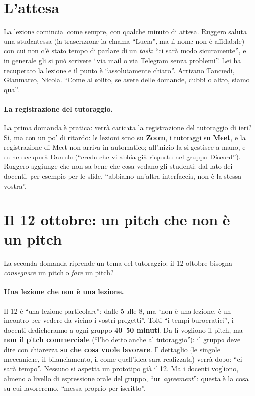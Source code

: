 \section{L'attesa}
\label{a8:sec:attesa}

La lezione comincia, come sempre, con qualche minuto di attesa. Ruggero saluta una
studentessa (la trascrizione la chiama ``Lucia'', ma il nome non è affidabile) con cui
non c'è stato tempo di parlare di un \emph{task}: ``ci sarà modo sicuramente'', e in
generale gli si può scrivere ``via mail o via Telegram senza problemi''. Lei ha
recuperato la lezione e il punto è ``assolutamente chiaro''. Arrivano Tancredi,
Gianmarco, Nicola. ``Come al solito, se avete delle domande, dubbi o altro, siamo
qua''.

\paragraph{La registrazione del tutoraggio.} La prima domanda è pratica: verrà
caricata la registrazione del tutoraggio di ieri? Sì, ma con un po' di ritardo: le
lezioni sono su \textbf{Zoom}, i tutoraggi su \textbf{Meet}, e la registrazione di Meet
non arriva in automatico; all'inizio la si gestisce a mano, e se ne occuperà Daniele
(``credo che vi abbia già risposto nel gruppo Discord''). Ruggero aggiunge che non sa
bene che cosa vedano gli studenti: dal lato dei docenti, per esempio per le slide,
``abbiamo un'altra interfaccia, non è la stessa vostra''.

\section{Il 12 ottobre: un pitch che non è un pitch}
\label{a8:sec:pitch}

La seconda domanda riprende un tema del tutoraggio: il 12 ottobre bisogna
\emph{consegnare} un pitch o \emph{fare} un pitch?

\paragraph{Una lezione che non è una lezione.} Il 12 è ``una lezione particolare'':
dalle 5 alle 8, ma ``non è una lezione, è un incontro per vedere da vicino i vostri
progetti''. Tolti ``i tempi burocratici'', i docenti dedicheranno a ogni gruppo
\textbf{40--50 minuti}. Da lì vogliono il pitch, ma \textbf{non il pitch commerciale}
(``l'ho detto anche al tutoraggio''): il gruppo deve dire con chiarezza \textbf{su che
cosa vuole lavorare}. Il dettaglio (le singole meccaniche, il bilanciamento, il come
quell'idea sarà realizzata) verrà dopo: ``ci sarà tempo''. Nessuno si aspetta un
prototipo già il 12. Ma i docenti vogliono, almeno a livello di espressione orale del
gruppo, ``un \emph{agreement}'': questa è la cosa su cui lavoreremo, ``messa proprio
per iscritto''.


